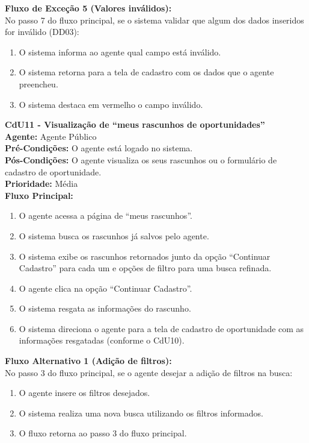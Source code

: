 \noindent\textbf{Fluxo de Exceção 5 (Valores inválidos):}\\
No passo 7 do fluxo principal, se o sistema validar que algum dos dados inseridos for inválido (DD03):
\begin{enumerate}[noitemsep, topsep=-5pt, parsep=0pt]
    \item O sistema informa ao agente qual campo está inválido.
    \item O sistema retorna para a tela de cadastro com os dados que o agente preencheu.
    \item O sistema destaca em vermelho o campo inválido.
\end{enumerate}


\vspace{7pt}
\noindent\textbf{\normalsize CdU11 - Visualização de ``meus rascunhos de oportunidades''}\\
\noindent\textbf{Agente:} Agente Público\\ 
\textbf{Pré-Condições:} O agente está logado no sistema.\\ 
\textbf{Pós-Condições:} O agente visualiza os seus rascunhos ou o formulário de cadastro de oportunidade.\\
\textbf{Prioridade:} Média \vspace{3pt}\\
\noindent\textbf{Fluxo Principal:}
\begin{enumerate}[noitemsep, topsep=-5pt, parsep=0pt]
    \item O agente acessa a página de ``meus rascunhos''.
    \item O sistema busca os rascunhos já salvos pelo agente.
    \item O sistema exibe os rascunhos retornados junto da opção ``Continuar Cadastro'' para cada um e opções de filtro para uma busca refinada.
    \item O agente clica na opção ``Continuar Cadastro''.
    \item O sistema resgata as informações do rascunho.
    \item O sistema direciona o agente para a tela de cadastro de oportunidade com as informações resgatadas (conforme o CdU10).
\end{enumerate}

\noindent\textbf{Fluxo Alternativo 1 (Adição de filtros):}\\
No passo 3 do fluxo principal, se o agente desejar a adição de filtros na busca:
\begin{enumerate}[noitemsep, topsep=-5pt, parsep=0pt]
    \item O agente insere os filtros desejados.
    \item O sistema realiza uma nova busca utilizando os filtros informados.
    \item O fluxo retorna ao passo 3 do fluxo principal.
\end{enumerate}

